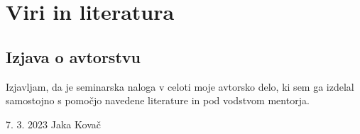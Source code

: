 \documentclass[12pt]{article}
\begin{document}
\newpage

\begingroup
\makeatletter
        \section{Viri in literatura}
        \nocite{*}
        \printbibliography[heading=none]
\makeatother
\endgroup
\newpage

\begin{samepage}
    \thispagestyle{empty}
    \section*{Izjava o avtorstvu}
    Izjavljam, da je seminarska naloga v celoti moje avtorsko delo, ki sem ga
    izdelal samostojno s pomočjo navedene literature in pod vodstvom mentorja.

    \vfill

    7. 3. 2023 \hfill Jaka Kovač

    \vspace{3 cm}
\end{samepage}
\end{document}
